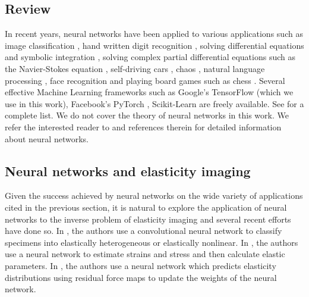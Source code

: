 \documentclass[12pt]{article}
\begin{document}
\subsection{Review}
In recent years, neural networks have been applied to various applications such as image classification \cite{paper:hinton2017}, hand written digit recognition \cite{paper:kulkarni2018}, solving differential equations and symbolic integration \cite{misc:lample2019}, solving complex partial differential equations such as the Navier-Stokes equation \cite{misc:anandkumar2020}, self-driving cars \cite{misc:agnihotri2019,misc:nvidiaselfdriving2016}, chaos \cite{paper:pathak2018}, natural language processing \cite{misc:googlenlp}, face recognition \cite{conf:taigman2014} and playing board games such as chess \cite{paper:alphazero}. Several effective Machine Learning frameworks such as Google's TensorFlow \cite{misc:tensorflow} (which we use in this work), Facebook's PyTorch \cite{incollect:pytorch}, Scikit-Learn \cite{paper:scikit-learn} are freely available. See \cite{misc:compdeep} for a complete list. We do not cover the theory of neural networks in this work. We refer the interested reader to \cite{book:aggarwal,book:goodfellow,book:chollet,misc:cs231n,misc:andrewng,misc:udemy} and references therein for detailed information about neural networks.
\subsection{Neural networks and elasticity imaging}
Given the success achieved by neural networks on the wide variety of applications cited in the previous section, it is natural to explore the application of neural networks to the inverse problem of elasticity imaging and several recent efforts \cite{paper:pateloberai2019,misc:gu2020,paper:hoeriginsana2016} have done so. In \cite{paper:pateloberai2019}, the authors use a convolutional neural network to classify specimens into elastically heterogeneous or elastically nonlinear. In \cite{paper:hoeriginsana2016}, the authors use a neural network to estimate strains and stress and then calculate elastic parameters. In \cite{misc:gu2020}, the authors use a neural network which predicts elasticity distributions using residual force maps to update the weights of the neural network.
\end{document}
